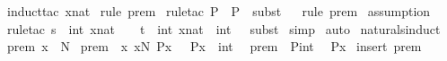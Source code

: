 \begin{isabellebody}
\ {\isacharparenleft}induct{\isacharunderscore}tac\ {\isachardoublequoteopen}xnat{\isachardoublequoteclose}{\isacharparenright}\isanewline
{}\isamarkupfalse%
\ {\isacharparenleft}rule\ prem{}{\isacharparenright}\isanewline
{}\isamarkupfalse%
\ {\isacharparenleft}rule{\isacharunderscore}tac\ P\ {\isacharequal}\ {\isachardoublequoteopen}P{\isachardoublequoteclose}\ \ subst{\isacharparenright}\isanewline
{}\isamarkupfalse%
\ {}\isanewline
{}\isamarkupfalse%
\ {\isacharparenleft}rule\ prem{}{\isacharparenright}\isanewline
{}\isamarkupfalse%
\ assumption\isanewline
{}\isamarkupfalse%
\ {\isacharparenleft}rule{\isacharunderscore}tac\ s\ {\isacharequal}\ {\isachardoublequoteopen}int\ {\isacharparenleft}xnat\ {\isacharplus}\ {}{\isacharparenright}{\isachardoublequoteclose}\ \ t\ {\isacharequal}\ {\isachardoublequoteopen}int\ xnat\ {\isacharplus}\ int\ {}{\isachardoublequoteclose}\ \ subst{\isacharparenright}\isanewline
{}\isamarkupfalse%
\ simp\isanewline
{}\isamarkupfalse%
\ auto\isanewline
{}\isamarkupfalse%
%
\endisatagproof
{\isafoldproof}%
%
\isadelimproof
\isanewline
%
\endisadelimproof
\isanewline
\isanewline
\isanewline
{}\isamarkupfalse%
\ naturals{\isacharunderscore}induct{\isacharcolon}\ \isanewline
{}\ prem{}{\isacharcolon}\ {\isachardoublequoteopen}x\ {\isacharcolon}\ {\isacharpercent}N{\isachardoublequoteclose}\isanewline
{}\ prem{}{\isacharcolon}\ {\isachardoublequoteopen}{\isacharbang}{\isacharbang}\ x{\isachardot}{\isacharbrackleft}{\isacharbar}\ x{\isacharcolon}{\isacharpercent}N{\isacharsemicolon}\ P{\isacharparenleft}x{\isacharparenright}\ {\isacharbar}{\isacharbrackright}\ {\isacharequal}{\isacharequal}{\isachargreater}\ P{\isacharparenleft}x\ {\isacharplus}\ int\ {}{\isacharparenright}{\isachardoublequoteclose}\isanewline
{}\ prem{}{\isacharcolon}\ \ {\isachardoublequoteopen}P{\isacharparenleft}int\ {}{\isacharparenright}{\isachardoublequoteclose}\isanewline
{}\ {\isachardoublequoteopen}P{\isacharparenleft}x{\isacharparenright}{\isachardoublequoteclose}\isanewline
%
\isadelimproof
%
\endisadelimproof
%
\isatagproof
{}\isamarkupfalse%
\ {\isacharparenleft}insert\ prem{}{\isacharparenright}\isanewline
{}\isamarkupfalse%

\end{isabellebody}
